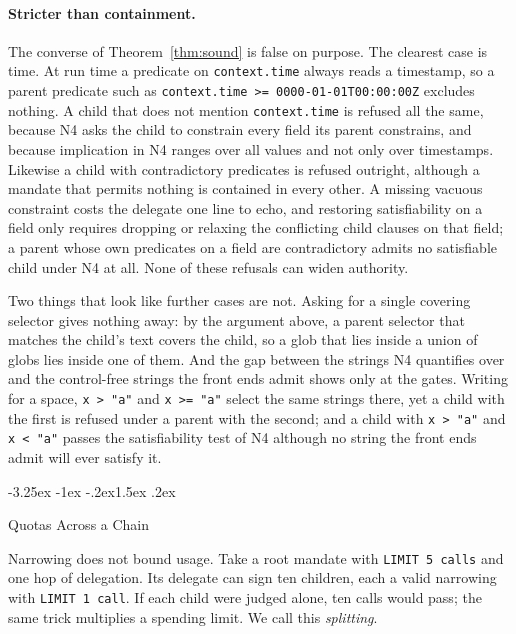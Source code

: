 \documentclass[10pt,twocolumn]{article}
\makeatletter
\theoremstyle{plain}
\theoremstyle{definition}
\renewcommand\subsection{\@startsection{subsection}{2}{\z@}%
  {-3.25ex \@plus -1ex \@minus -.2ex}{1.5ex \@plus .2ex}%
  {\normalfont\large\bfseries\raggedright}}
\makeatother
\begin{document}
\paragraph{Stricter than containment.}
The converse of Theorem~\ref{thm:sound} is false on purpose. The clearest case is time. At run time a predicate on \texttt{context.time} always reads a timestamp, so a parent predicate such as \texttt{context.time >= 0000-01-01T00:00:00Z} excludes nothing. A child that does not mention \texttt{context.time} is refused all the same, because N4 asks the child to constrain every field its parent constrains, and because implication in N4 ranges over all values and not only over timestamps. Likewise a child with contradictory predicates is refused outright, although a mandate that permits nothing is contained in every other. A missing vacuous constraint costs the delegate one line to echo, and restoring satisfiability on a field only requires dropping or relaxing the conflicting child clauses on that field; a parent whose own predicates on a field are contradictory admits no satisfiable child under N4 at all. None of these refusals can widen authority.

Two things that look like further cases are not. Asking for a single covering selector gives nothing away: by the argument above, a parent selector that matches the child's text covers the child, so a glob that lies inside a union of globs lies inside one of them. And the gap between the strings N4 quantifies over and the control-free strings the front ends admit shows only at the gates. Writing \texttt{\textvisiblespace} for a space, \mbox{\texttt{x > "a"}} and \mbox{\texttt{x >= "a\textvisiblespace"}} select the same strings there, yet a child with the first is refused under a parent with the second; and a child with \mbox{\texttt{x > "a"}} and \mbox{\texttt{x < "a\textvisiblespace"}} passes the satisfiability test of N4 although no string the front ends admit will ever satisfy it.

\subsection{Quotas Across a Chain}
\label{sec:quotas}

Narrowing does not bound usage. Take a root mandate with \texttt{LIMIT 5 calls} and one hop of delegation. Its delegate can sign ten children, each a valid narrowing with \texttt{LIMIT 1 call}. If each child were judged alone, ten calls would pass; the same trick multiplies a spending limit. We call this \emph{splitting}.
\end{document}
